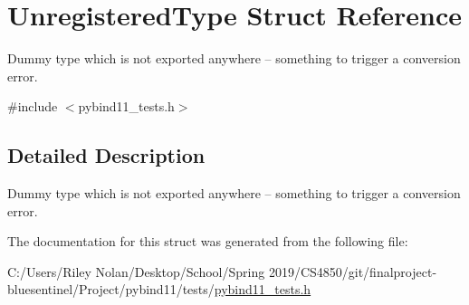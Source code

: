 \hypertarget{struct_unregistered_type}{}\section{Unregistered\+Type Struct Reference}
\label{struct_unregistered_type}


Dummy type which is not exported anywhere -- something to trigger a conversion error.  




{\ttfamily \#include $<$pybind11\+\_\+tests.\+h$>$}



\subsection{Detailed Description}
Dummy type which is not exported anywhere -- something to trigger a conversion error. 

The documentation for this struct was generated from the following file\+:\begin{DoxyCompactItemize}
\item 
C\+:/\+Users/\+Riley Nolan/\+Desktop/\+School/\+Spring 2019/\+C\+S4850/git/finalproject-\/bluesentinel/\+Project/pybind11/tests/\mbox{\hyperlink{pybind11__tests_8h}{pybind11\+\_\+tests.\+h}}\end{DoxyCompactItemize}
